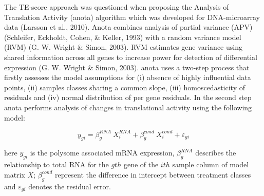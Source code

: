 \documentclass[12pt,openany]{book}
\begin{document}
The TE-score approach was questioned when proposing the Analysis of
Translation Activity (anota) algorithm which was developed for
DNA-microarray data (Larsson et al., 2010). Anota combines analysis of
partial variance (APV) (Schleifer, Eckholdt, Cohen, \& Keller, 1993)
with a random variance model (RVM) (G. W. Wright \& Simon, 2003). RVM
estimates gene variance using shared information across all genes to
increase power for detection of differential expression (G. W. Wright \&
Simon, 2003). anota uses a two-step process that firstly assesses the
model assumptions for (i) absence of highly influential data points,
(ii) samples classes sharing a common slope, (iii) homoscedasticity of
residuals and (iv) normal distribution of per gene residuals. In the
second step anota performs analysis of changes in translational activity
using the following model:

\[y_{gi} = \beta_g^{RNA}\ X_i^{RNA}+ \beta_g^{cond}\ X_i^{cond} + \varepsilon_{gi}\]

here \(y_{gi}\) is the polysome associated mRNA expression,
\(\beta_g^{RNA}\) describes the relationship to total RNA for the
\(gth\) gene of the \(ith\) sample column of model matrix \(X\);
\(\beta_g^{cond}\) represent the difference in intercept between
treatment classes and \(\varepsilon_{gi}\) denotes the residual error.
\clearpage
\end{document}
